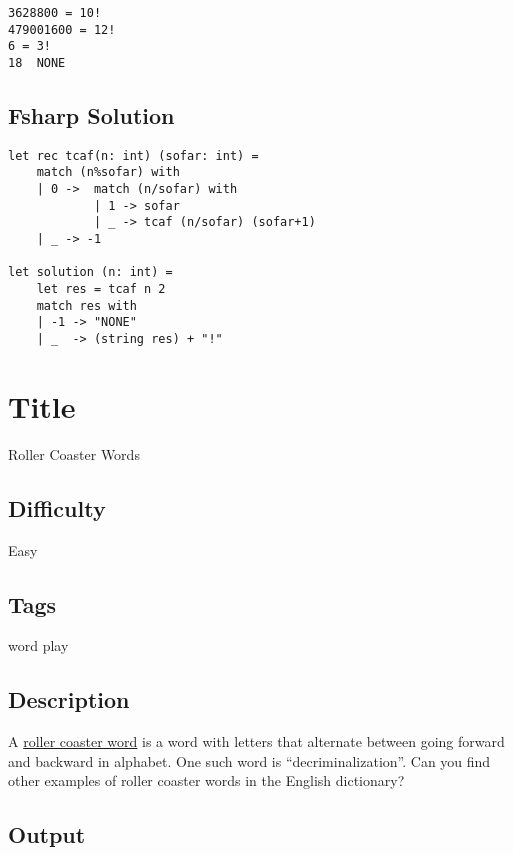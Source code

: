 \begin{verbatim}
3628800 = 10!
479001600 = 12!
6 = 3!
18  NONE
\end{verbatim}

\subsection{Fsharp Solution}\label{fsharp-solution-2}

\begin{verbatim}
let rec tcaf(n: int) (sofar: int) =
    match (n%sofar) with 
    | 0 ->  match (n/sofar) with
            | 1 -> sofar
            | _ -> tcaf (n/sofar) (sofar+1)
    | _ -> -1

let solution (n: int) = 
    let res = tcaf n 2
    match res with
    | -1 -> "NONE"
    | _  -> (string res) + "!"
\end{verbatim}

\section{Title}\label{title-38}

Roller Coaster Words

\subsection{Difficulty}\label{difficulty-37}

Easy

\subsection{Tags}\label{tags-38}

word play

\subsection{Description}\label{description-38}

A
\href{http://www.questrel.com/records.html\#spelling_alphabetical_order_entire_word_roller-coaster}{roller
coaster word} is a word with letters that alternate between going
forward and backward in alphabet. One such word is
``decriminalization''. Can you find other examples of roller coaster
words in the English dictionary?

\subsection{Output}\label{output-1}

